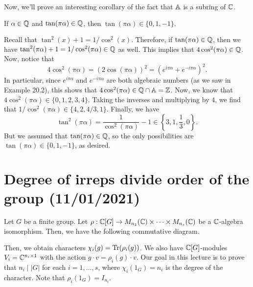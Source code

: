 Now, we'll prove an interesting corollary of the fact that $\mathbb{A}$ is a subring of $\mathbb{C}$.

\begin{cor}{}
    If $\alpha \in \mathbb{Q}$ and $\tan(\pi\alpha) \in \mathbb{Q}$, then $\tan(\pi\alpha) 
    \in \{0, 1, -1\}$. 
\end{cor}
\begin{pf}
    Recall that $\tan^2(x) + 1 = 1/\cos^2(x)$. Therefore, if $\tan(\pi\alpha) 
    \in \mathbb{Q}$, then we have $\tan^2(\pi\alpha) + 1 = 1/\cos^2(\pi\alpha) \in \mathbb{Q}$ as 
    well. This implies that $4\cos^2(\pi\alpha) \in \mathbb{Q}$. Now, notice that 
    \[ 4\cos^2(\pi\alpha) = (2 \cos(\pi\alpha))^2 = (e^{i\pi\alpha} + 
    e^{-i\pi\alpha})^2. \] 
    In particular, since $e^{i\pi\alpha}$ and $e^{-i\pi\alpha}$ are both 
    algebraic numbers (as we saw in Example 20.2), this shows that 
    $4\cos^2(\pi\alpha) \in \mathbb{Q} \cap \mathbb{A} = \mathbb{Z}$. Now, we know that 
    $4\cos^2(\pi\alpha) \in \{0, 1, 2, 3, 4\}$. Taking the inverses and 
    multiplying by $4$, we find that $1/\cos^2(\pi\alpha) \in \{4, 2, 4/3, 1\}$. 
    Finally, we have 
    \[ \tan^2(\pi\alpha) = \frac{1}{\cos^2(\pi\alpha)} - 1 \in 
    \left\{3, 1, \frac13, 0\right\}. \]  
    But we assumed that $\tan(\pi\alpha) \in \mathbb{Q}$, so the only possibilities are 
    $\tan(\pi\alpha) \in \{0, 1, -1\}$, as desired. 
\end{pf}

\section{Degree of irreps divide order of the group (11/01/2021)} 
Let $G$ be a finite group. Let $\rho : \mathbb{C}[G] \to M_{n_1}(\mathbb{C}) \times \cdots 
\times M_{n_s}(\mathbb{C})$ be a $\mathbb{C}$-algebra isomorphism. Then, we have the following 
commutative diagram. 
\begin{center}
\end{center}
Then, we obtain characters $\chi_i(g) = \operatorname{Tr}(\rho_i(g))$. We also have $\mathbb{C}[G]$-modules 
$V_i = \mathbb{C}^{n_i \times 1}$ with the action $g \cdot v = \rho_i(g) \cdot v$. 
Our goal in this lecture is to prove that $n_i \mid |G|$ for each $i = 1, \dots, s$, 
where $\chi_i(1_G) = n_i$ is the degree of the character. Note that 
$\rho_i(1_G) = I_{n_i}$. 

